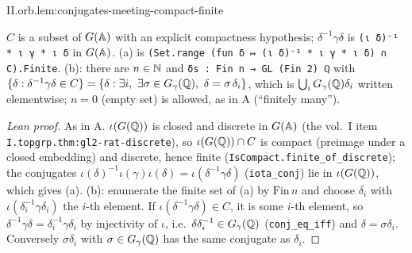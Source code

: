 \begin{lemma}
\end{lemma}
\begin{tfformal}{II.orb.lem:conjugates-meeting-compact-finite}
\begin{tffidelity}
$C$ is a subset of $G(\mathbb{A})$ with an explicit compactness hypothesis; $\delta^{-1}\gamma\delta$ is \texttt{(ι δ)⁻¹ * ι γ * ι δ} in $G(\mathbb{A})$. (a) is \texttt{(Set.range (fun δ ↦ (ι δ)⁻¹ * ι γ * ι δ) ∩ C).Finite}. (b): there are $n\in\mathbb{N}$ and \texttt{δs : Fin n → GL (Fin 2) ℚ} with $\{\delta:\delta^{-1}\gamma\delta\in C\}=\{\delta:\exists i,\ \exists\sigma\in G_\gamma(\Q),\ \delta=\sigma\,\delta_i\}$, which is $\bigcup_iG_\gamma(\mathbb{Q})\delta_i$ written elementwise; $n=0$ (empty set) is allowed, as in A (``finitely many'').
\end{tffidelity}
\end{tfformal}
\begin{proof}[Lean proof]
As in A. $\iota(G(\mathbb{Q}))$ is closed and discrete in $G(\mathbb{A})$ (the vol.~I item \texttt{I.topgrp.thm:gl2-rat-discrete}), so $\iota(G(\mathbb{Q}))\cap C$ is compact (preimage under a closed embedding) and discrete, hence finite (\texttt{IsCompact.finite\_of\_discrete}); the conjugates $\iota(\delta)^{-1}\iota(\gamma)\iota(\delta)=\iota(\delta^{-1}\gamma\delta)$ (\texttt{iota\_conj}) lie in $\iota(G(\mathbb{Q}))$, which gives (a). (b): enumerate the finite set of (a) by $\mathrm{Fin}\,n$ and choose $\delta_i$ with $\iota(\delta_i^{-1}\gamma\delta_i)$ the $i$-th element. If $\iota(\delta^{-1}\gamma\delta)\in C$, it is some $i$-th element, so $\delta^{-1}\gamma\delta=\delta_i^{-1}\gamma\delta_i$ by injectivity of $\iota$, i.e.\ $\delta\delta_i^{-1}\in G_\gamma(\mathbb{Q})$ (\texttt{conj\_eq\_iff}) and $\delta=\sigma\delta_i$. Conversely $\sigma\delta_i$ with $\sigma\in G_\gamma(\mathbb{Q})$ has the same conjugate as $\delta_i$.
\end{proof}

